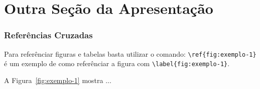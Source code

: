 \documentclass[compress]{beamer}
\begin{document}
\section[Outra Seção]{Outra Seção da Apresentação}

\begin{frame}[fragile]
  \frametitle{Referências Cruzadas}

  Para referênciar figuras e tabelas basta utilizar o comando:
  \lstinline|\ref{fig:exemplo-1}| é um exemplo de como referênciar a figura com
  \lstinline|\label{fig:exemplo-1}|.

  A Figura~\ref{fig:exemplo-1} mostra ...
  
\end{frame}
\end{document}
